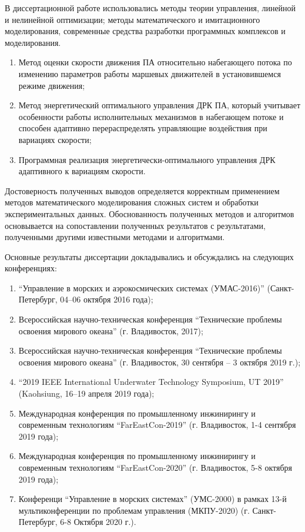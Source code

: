 {\methods} В диссертационной работе использовались методы теории управления, линейной и нелинейной оптимизации; методы математического и имитационного моделирования, современные средства разработки программных комплексов и моделирования.

{}
\begin{enumerate}[beginpenalty=10000] %
  \item Метод оценки скорости движения ПА относительно набегающего потока по изменению параметров работы маршевых движителей в установившемся режиме движения;
  \item Метод энергетический оптимального управления ДРК ПА, который учитывает особенности работы исполнительных механизмов в набегающем потоке и способен адаптивно перераспределять управляющие воздействия при вариациях скорости;
  \item Программная реализация энергетически-оптимального управления ДРК адаптивного к вариациям скорости.
\end{enumerate}

{\reliability} Достоверность полученных выводов определяется корректным применением методов математического моделирования сложных систем и обработки экспериментальных данных. Обоснованность полученных методов и алгоритмов основывается на сопоставлении полученных результатов с результатами, полученными другими известными методами и алгоритмами.

{\probation}
Основные результаты диссертации
докладывались и обсуждались на следующих конференциях:
\begin{enumerate}
    \item ``Управление в морских и аэрокосмических системах (УМАС-2016)'' (Санкт-Петербург, 04–06 октября 2016 года);
    \item Всероссийская научно-техническая конференция ``Технические проблемы освоения мирового океана'' (г. Владивосток, 2017);
    \item Всероссийская научно-техническая конференция ``Технические проблемы освоения мирового океана'' (г. Владивосток, 30 сентября – 3 октября 2019 г.);
    \item ``2019 IEEE International Underwater Technology Symposium, UT 2019'' (Kaohsiung, 16–19 апреля 2019 года);
    \item Международная конференция по промышленному инжинирингу и современным технологиям ``FarEastCon-2019'' (г. Владивосток, 1-4 сентября 2019 года);
    \item Международная конференция по промышленному инжинирингу и современным технологиям ``FarEastCon-2020'' (г. Владивосток, 5-8 октября 2019 года);
    \item Конференци ``Управление в морских системах'' (УМС-2000) в рамках 13-й мультиконференции по проблемам управления (МКПУ-2020) (г. Санкт-Петербург, 6-8 Октября 2020 г.).
\end{enumerate}

